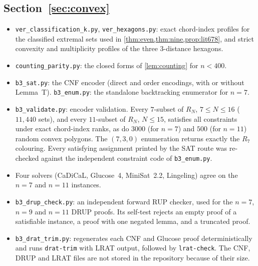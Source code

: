 \documentclass[11pt]{amsart}
\theoremstyle{definition}
\theoremstyle{remark}
\begin{document}
\subsection*{\texorpdfstring{Section~\ref{sec:convex}}{Convex position}}
\begin{itemize}[leftmargin=2em]
\item \texttt{ver\_classification\_k.py}, \texttt{ver\_hexagons.py}: exact chord-index profiles for the classified extremal sets used in \cref{thm:even,thm:nine,prop:lit678}, and strict convexity and multiplicity profiles of the three $3$-distance hexagons.
\item \texttt{counting\_parity.py}: the closed forms of \cref{lem:counting} for $n<400$.
\item \texttt{b3\_sat.py}: the CNF encoder (direct and order encodings, with or without Lemma~T). \texttt{b3\_enum.py}: the standalone backtracking enumerator for $n=7$.
\item \texttt{b3\_validate.py}: encoder validation. Every $7$-subset of $R_N$, $7\le N\le16$ ($11{,}440$ sets), and every $11$-subset of $R_N$, $N\le15$, satisfies all constraints under exact chord-index ranks, as do $3000$ (for $n=7$) and $500$ (for $n=11$) random convex polygons. The $(7,3,0)$ enumeration returns exactly the $R_7$ colouring. Every satisfying assignment printed by the SAT route was re-checked against the independent constraint code of \texttt{b3\_enum.py}.
\item Four solvers (CaDiCaL, Glucose~4, MiniSat~2.2, Lingeling) agree on the $n=7$ and $n=11$ instances.
\item \texttt{b3\_drup\_check.py}: an independent forward RUP checker, used for the $n=7$, $n=9$ and $n=11$ DRUP proofs. Its self-test rejects an empty proof of a satisfiable instance, a proof with one negated lemma, and a truncated proof.
\item \texttt{b3\_drat\_trim.py}: regenerates each CNF and Glucose proof deterministically and runs \texttt{drat-trim} with LRAT output, followed by \texttt{lrat-check}. The CNF, DRUP and LRAT files are not stored in the repository because of their size.
\end{itemize}
\end{document}
